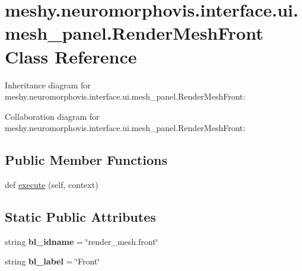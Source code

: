 \hypertarget{classmeshy_1_1neuromorphovis_1_1interface_1_1ui_1_1mesh__panel_1_1RenderMeshFront}{}\section{meshy.\+neuromorphovis.\+interface.\+ui.\+mesh\+\_\+panel.\+Render\+Mesh\+Front Class Reference}
\label{classmeshy_1_1neuromorphovis_1_1interface_1_1ui_1_1mesh__panel_1_1RenderMeshFront}


Inheritance diagram for meshy.\+neuromorphovis.\+interface.\+ui.\+mesh\+\_\+panel.\+Render\+Mesh\+Front\+:


Collaboration diagram for meshy.\+neuromorphovis.\+interface.\+ui.\+mesh\+\_\+panel.\+Render\+Mesh\+Front\+:
\subsection*{Public Member Functions}
\begin{DoxyCompactItemize}
\item 
def \hyperlink{classmeshy_1_1neuromorphovis_1_1interface_1_1ui_1_1mesh__panel_1_1RenderMeshFront_a10a30ec2e986435b0c4f3cfc1d03831b}{execute} (self, context)
\end{DoxyCompactItemize}
\subsection*{Static Public Attributes}
\begin{DoxyCompactItemize}
\item 
string {\bfseries bl\+\_\+idname} = \char`\"{}render\+\_\+mesh.\+front\char`\"{}\hypertarget{classmeshy_1_1neuromorphovis_1_1interface_1_1ui_1_1mesh__panel_1_1RenderMeshFront_a651ff3affe00b6d1bf4cb07dd9489144}{}\label{classmeshy_1_1neuromorphovis_1_1interface_1_1ui_1_1mesh__panel_1_1RenderMeshFront_a651ff3affe00b6d1bf4cb07dd9489144}

\item 
string {\bfseries bl\+\_\+label} = \char`\"{}Front\char`\"{}\hypertarget{classmeshy_1_1neuromorphovis_1_1interface_1_1ui_1_1mesh__panel_1_1RenderMeshFront_af23fae4ac74a196b1dd2a83348aa9e47}{}\label{classmeshy_1_1neuromorphovis_1_1interface_1_1ui_1_1mesh__panel_1_1RenderMeshFront_af23fae4ac74a196b1dd2a83348aa9e47}

\end{DoxyCompactItemize}


